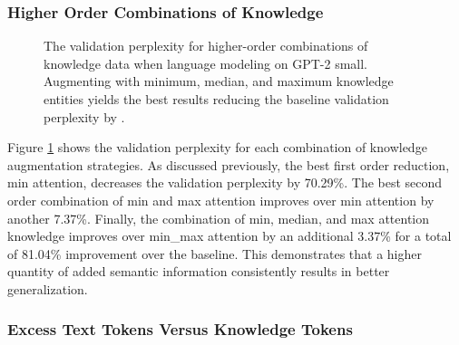 \documentclass[phd,electronic,oneside,twosidetoc,letterpaper,chaptercenter,parttop,lof]{byumsphd}
\begin{document}
\subsubsection{Higher Order Combinations of Knowledge}

\begin{figure}
\centering
{}  
    \caption[Higher-order combinations validation perplexity]{
        The validation perplexity for higher-order combinations of knowledge data when language modeling on GPT-2 small.
        Augmenting with minimum, median, and maximum knowledge entities yields the best results reducing the baseline validation perplexity by \LMLossPercentageDecrease.
    }
    \label{fig:higher-order}
\end{figure}

Figure \ref{fig:higher-order} shows the validation perplexity for each combination of knowledge augmentation strategies. 
As discussed previously, the best first order reduction, min attention,  decreases the validation perplexity by 70.29\%.
The best second order combination of min and max attention improves over min attention by another 7.37\%.
Finally, the combination of min, median, and max attention knowledge improves over min\_max attention by an additional 3.37\% for a total of 81.04\% improvement over the baseline.
This demonstrates that a higher quantity of added semantic information consistently results in better generalization.

\subsubsection{Excess Text Tokens Versus Knowledge Tokens}
\end{document}
